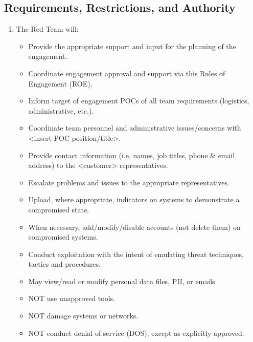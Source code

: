\documentclass[12pt,letterpaper]{article}
\begin{document}
\subsection{Requirements, Restrictions, and Authority}
\begin{enumerate}[label=\alph*.]
    \item The Red Team will:
    \begin{itemize}
        \item Provide the appropriate support and input for the planning of the engagement.
        \item Coordinate engagement approval and support via this Rules of Engagement (ROE).
        \item Inform target of engagement POCs of all team requirements (logistics, administrative, etc.).
        \item Coordinate team personnel and administrative issues/concerns with <insert POC position/title>.
        \item Provide contact information (i.e. names, job titles, phone \& email address) to the <customer> representatives.
        \item Escalate problems and issues to the appropriate representatives.
        \item Upload, where appropriate, indicators on systems to demonstrate a compromised state.
        \item When necessary, add/modify/disable accounts (not delete them) on compromised systems.
        \item Conduct exploitation with the intent of emulating threat techniques, tactics and procedures.
        \item May view/read or modify personal data files, PII, or emails.
        \item NOT use unapproved tools.
        \item NOT damage systems or networks.
        \item NOT conduct denial of service (DOS), except as explicitly approved.
    \end{itemize}
\end{enumerate}
\end{document}
